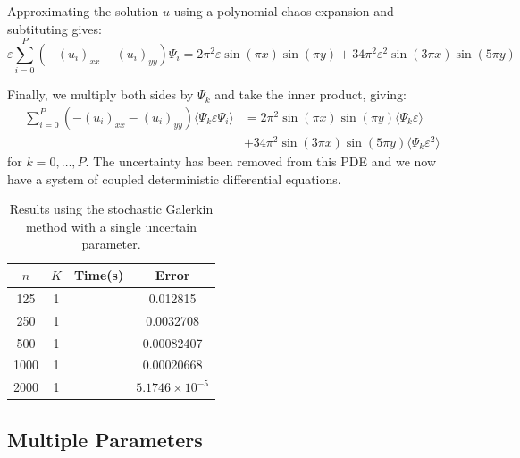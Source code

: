\documentclass{article}
\numberwithin{equation}{section}
\begin{document}
Approximating the solution $u$ using a polynomial chaos expansion and subtituting gives:
\begin{equation}
\varepsilon \sum_{i=0}^P (-(u_i)_{xx} -(u_i)_{yy}) \Psi_i = 2\pi^2 \varepsilon \sin(\pi x) \sin(\pi y)+ 34 \pi^2 \varepsilon^2 \sin(3 \pi x) \sin(5 \pi y)
\end{equation}

Finally, we multiply both sides by $\Psi_k$ and take the inner product, giving:
\begin{equation}
\begin{split}
\sum_{i=0}^P (-(u_i)_{xx} -(u_i)_{yy}) \langle \Psi_k \varepsilon \Psi_i \rangle & = 2\pi^2 \sin(\pi x) \sin(\pi y) \langle \Psi_k \varepsilon \rangle \\
& + 34 \pi^2 \sin(3 \pi x) \sin(5 \pi y) \langle \Psi_k \varepsilon^2 \rangle
\end{split}
\end{equation}
for $k = 0, \dots, P$. The uncertainty has been removed from this PDE and we now have a system of coupled deterministic differential equations.

\begin{table}[H]
\centering
\begin{tabular}{|c|c|c|c|}
\hline
$n$ & $K$ & Time(s) & Error \\
\hline
125 & 1 & & 0.012815 \\
250 & 1 & & 0.0032708 \\
500 & 1 & & 0.00082407 \\
1000 & 1 & & 0.00020668 \\
2000 & 1 & & $5.1746 \times 10^{-5}$ \\
\hline
\end{tabular}
\captionsetup{justification=centering}
\caption{Results using the stochastic Galerkin method with a single uncertain parameter.}
\end{table}







\newpage

\subsection{Multiple Parameters}
\end{document}
